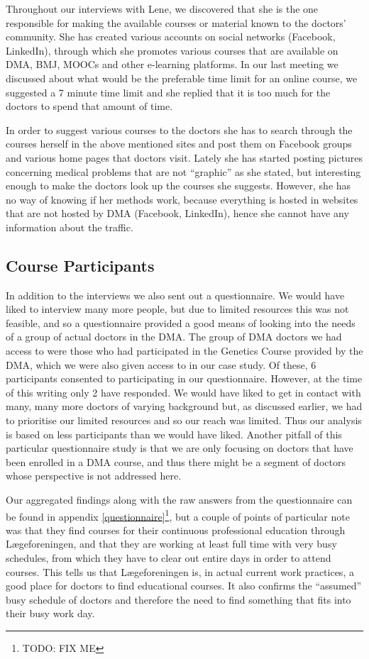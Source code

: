 Throughout our interviews with Lene, we discovered that she is the one responsible for making the available courses or material known to the doctors’ community. She has created various accounts on social networks (Facebook, LinkedIn), through which she promotes various courses that are available on DMA, BMJ, MOOCs and other e-learning platforms. In our last meeting we discussed about what would be the preferable time limit for an online course, we suggested a 7 minute time limit  and she replied that it is too much for the doctors to spend that amount of time.

In order to suggest various courses to the doctors she has to search through the courses herself in the above mentioned sites and post them on Facebook groups and various home pages that doctors visit. Lately she has started posting pictures concerning medical problems that are not “graphic” as she stated, but interesting enough to make the doctors look up the courses she suggests. However, she has no way of knowing if her methods work, because everything is hosted in websites that are not hosted by DMA (Facebook, LinkedIn), hence she cannot have any information about the traffic.

\subsection{Course Participants}
In addition to the interviews we also sent out a questionnaire. We would have liked to interview many more people, but due to limited resources this was not feasible, and so a questionnaire provided a good means of looking into the needs of a group of actual doctors in the DMA. The group of DMA doctors we had access to were those who had participated in the Genetics Course provided by the DMA, which we were also given access to in our case study. Of these, 6 participants consented to participating in our questionnaire. However, at the time of this writing only 2 have responded. We would have liked to get in contact with many, many more doctors of varying background but, as discussed earlier, we had to prioritise our limited resources and so our reach was limited. Thus our analysis is based on less participants than we would have liked. Another pitfall of this particular questionnaire study is that we are only focusing on doctors that have been enrolled in a DMA course, and thus there might be a segment of doctors whose perspective is not addressed here.

Our aggregated findings along with the raw answers from the questionnaire can be found in appendix \ref{questionnaire}\footnote{TODO: FIX ME}, but a couple of points of particular note was that they find courses for their continuous professional education through Lægeforeningen, and that they are working at least full time with very busy schedules, from which they have to clear out entire days in order to attend courses. This tells us that Lægeforeningen is, in actual current work practices, a good place for doctors to find educational courses. It also confirms the “assumed” busy schedule of doctors and therefore the need to find something that fits into their busy work day.

